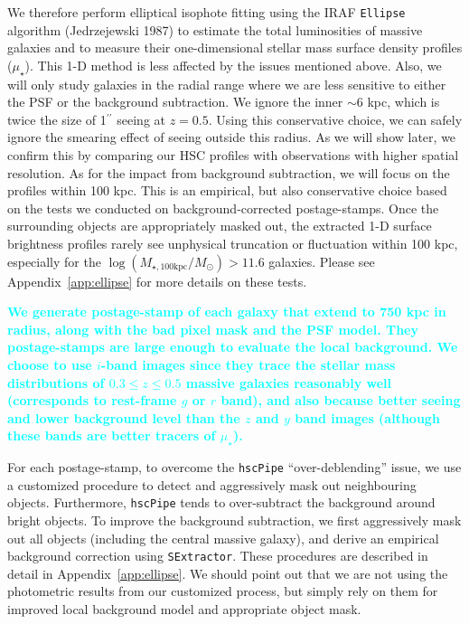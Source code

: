 \documentclass[a4paper,fleqn,usenatbib]{mnras}
\def\asec{$^{\prime\prime}$}
\def\logmtot{{$\log (M_{\star,100\mathrm{kpc}}/M_{\odot})$}}
\def\mden{{$\mu_{\star}$}}
\newcommand{\song}[1]{\textcolor{cyan}{\textbf{#1}}}
\begin{document}
    We therefore perform elliptical isophote fitting using the IRAF \texttt{Ellipse} 
    algorithm (Jedrzejewski 1987) to estimate the total luminosities of massive 
    galaxies and to measure their one-dimensional stellar mass surface 
    density profiles (\mden{}). 
    This 1-D method is less affected by the issues mentioned above. 
    Also, we will only study galaxies in the radial range where we are less 
    sensitive to either the PSF or the background subtraction.
    We ignore the inner $\sim6$ kpc, which is twice the size of 1\asec{} seeing at 
    $z=0.5$.
    Using this conservative choice, we can safely ignore the smearing effect of 
    seeing outside this radius.
    As we will show later, we confirm this by comparing our HSC profiles with 
    observations with higher spatial resolution. 
    As for the impact from background subtraction, we will focus on the profiles 
    within 100 kpc. 
    This is an empirical, but also conservative choice based on the tests we 
    conducted on background-corrected postage-stamps. 
    Once the surrounding objects are appropriately masked out, the extracted 1-D 
    surface brightness profiles rarely see unphysical truncation or fluctuation 
    within 100 kpc, especially for the \logmtot{}$>11.6$ galaxies. 
    Please see Appendix~\ref{app:ellipse} for more details on these tests.
    
    \song{
    We generate postage-stamp of each galaxy that extend to 750 kpc in radius, 
    along with the bad pixel mask and the PSF model. 
    They postage-stamps are large enough to evaluate the local background. 
    We choose to use $i$-band images since they trace the stellar mass distributions 
    of $0.3 \leq z \leq 0.5$ massive galaxies reasonably well 
    (corresponds to rest-frame $g$ or $r$ band), and also because better seeing 
    and lower background level than the $z$ and $y$ band images (although these 
    bands are better tracers of \mden{}). 
    }
    
    For each postage-stamp, to overcome the \texttt{hscPipe} ``over-deblending'' 
    issue, we use a customized procedure to detect and aggressively mask out
    neighbouring objects. 
    Furthermore, \texttt{hscPipe} tends to over-subtract the background around 
    bright objects. 
    To improve the background subtraction, we first aggressively mask 
    out all objects (including the central massive galaxy), and derive an 
    empirical background correction using \texttt{SExtractor}.
    These procedures are described in detail in Appendix~\ref{app:ellipse}. 
    We should point out that we are not using the photometric results from our 
    customized process, but simply rely on them for improved local background model
    and appropriate object mask.
\end{document}
